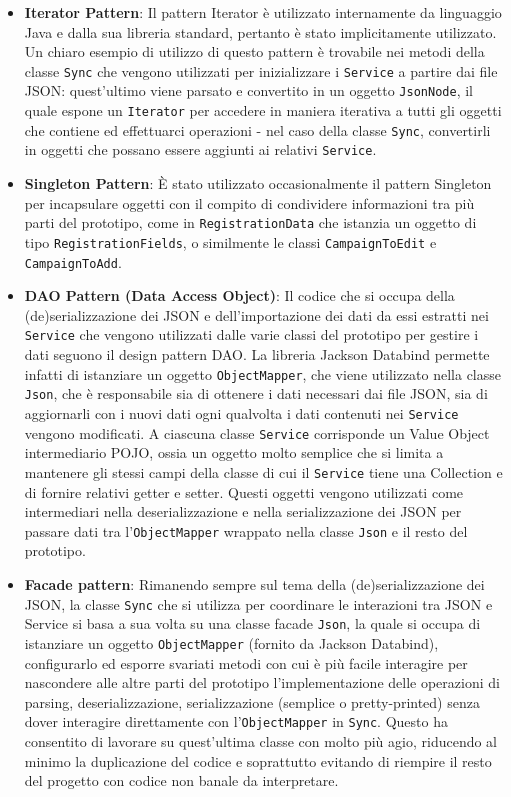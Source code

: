 \documentclass{article}
\begin{document}
\begin{itemize}
    \item \textbf{Iterator Pattern}: Il pattern Iterator è utilizzato internamente da linguaggio Java e dalla sua libreria standard, pertanto è stato implicitamente utilizzato. Un chiaro esempio di utilizzo di questo pattern è trovabile nei metodi della classe \texttt{Sync} che vengono utilizzati per inizializzare i \texttt{Service} a partire dai file JSON: quest'ultimo viene parsato e convertito in un oggetto \texttt{JsonNode}, il quale espone un \texttt{Iterator} per accedere in maniera iterativa a tutti gli oggetti che contiene ed effettuarci operazioni - nel caso della classe \texttt{Sync}, convertirli in oggetti che possano essere aggiunti ai relativi \texttt{Service}.
    \item \textbf{Singleton Pattern}: È stato utilizzato occasionalmente il pattern Singleton per incapsulare oggetti con il compito di condividere informazioni tra più parti del prototipo, come in \texttt{RegistrationData} che istanzia un oggetto di tipo \texttt{RegistrationFields}, o similmente le classi \texttt{CampaignToEdit} e \texttt{CampaignToAdd}.
    \item \textbf{DAO Pattern (Data Access Object)}: Il codice che si occupa della (de)serializzazione dei JSON e dell'importazione dei dati da essi estratti nei \texttt{Service} che vengono utilizzati dalle varie classi del prototipo per gestire i dati seguono il design pattern DAO. La libreria Jackson Databind permette infatti di istanziare un oggetto \texttt{ObjectMapper}, che viene utilizzato nella classe \texttt{Json}, che è responsabile sia di ottenere i dati necessari dai file JSON, sia di aggiornarli con i nuovi dati ogni qualvolta i dati contenuti nei \texttt{Service} vengono modificati. A ciascuna classe \texttt{Service} corrisponde un Value Object intermediario POJO, ossia un oggetto molto semplice che si limita a mantenere gli stessi campi della classe di cui il \texttt{Service} tiene una Collection e di fornire relativi getter e setter. Questi oggetti vengono utilizzati come intermediari nella deserializzazione e nella serializzazione dei JSON per passare dati tra l'\texttt{ObjectMapper} wrappato nella classe \texttt{Json} e il resto del prototipo.
    \item \textbf{Facade pattern}: Rimanendo sempre sul tema della (de)serializzazione dei JSON, la classe \texttt{Sync} che si utilizza per coordinare le interazioni tra JSON e Service si basa a sua volta su una classe facade \texttt{Json}, la quale si occupa di istanziare un oggetto \texttt{ObjectMapper} (fornito da Jackson Databind), configurarlo ed esporre svariati metodi con cui è più facile interagire per nascondere alle altre parti del prototipo l'implementazione delle operazioni di parsing, deserializzazione, serializzazione (semplice o pretty-printed) senza dover interagire direttamente con l'\texttt{ObjectMapper} in \texttt{Sync}. Questo ha consentito di lavorare su quest'ultima classe con molto più agio, riducendo al minimo la duplicazione del codice e soprattutto evitando di riempire il resto del progetto con codice non banale da interpretare.
\end{itemize}
\end{document}
